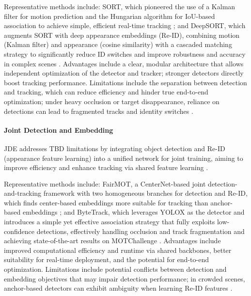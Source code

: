 Representative methods include: SORT, which pioneered the use of a Kalman filter for motion prediction and the Hungarian algorithm for IoU-based association to achieve simple, efficient real-time tracking \cite{169}; and DeepSORT, which augments SORT with deep appearance embeddings (Re-ID), combining motion (Kalman filter) and appearance (cosine similarity) with a cascaded matching strategy to significantly reduce ID switches and improve robustness and accuracy in complex scenes \cite{211}. Advantages include a clear, modular architecture that allows independent optimization of the detector and tracker; stronger detectors directly boost tracking performance. Limitations include the separation between detection and tracking, which can reduce efficiency and hinder true end-to-end optimization; under heavy occlusion or target disappearance, reliance on detections can lead to fragmented tracks and identity switches \cite{175}.

\paragraph{Joint Detection and Embedding}
JDE addresses TBD limitations by integrating object detection and Re-ID (appearance feature learning) into a unified network for joint training, aiming to improve efficiency and enhance tracking via shared feature learning \cite{173,132}.

Representative methods include: FairMOT, a CenterNet-based joint detection-and-tracking framework with two homogeneous branches for detection and Re-ID, which finds center-based embeddings more suitable for tracking than anchor-based embeddings \cite{208}; and ByteTrack, which leverages YOLOX as the detector and introduces a simple yet effective association strategy that fully exploits low-confidence detections, effectively handling occlusion and track fragmentation and achieving state-of-the-art results on MOTChallenge \cite{110}. Advantages include improved computational efficiency and runtime via shared backbones, better suitability for real-time deployment, and the potential for end-to-end optimization. Limitations include potential conflicts between detection and embedding objectives that may impair detection performance; in crowded scenes, anchor-based detectors can exhibit ambiguity when learning Re-ID features \cite{173}.

